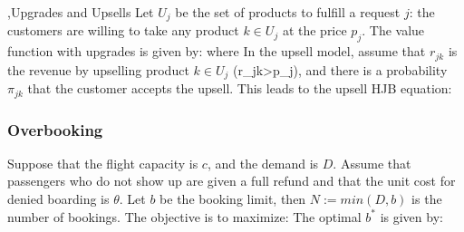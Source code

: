 \documentclass[12pt]{report}
\begin{document}
\sep{Upgrades and Upsells}
Let $U_j$ be the set of products to fulfill a request $j$: the customers are willing to take any product $k\in U_j$ at the price $p_j$. The value function with upgrades is given by:
where
In the upsell model, assume that $r_{jk}$ is the revenue by upselling product $k\in U_j$ (r_{jk}>p_j), and there is a probability $\pi_{jk}$ that the customer accepts the upsell.
This leads to the upsell HJB equation:

\subsubsection{Overbooking} \label{subsubsec:overbooking}
Suppose that the flight capacity is $c$, and the demand is $D$. Assume that passengers who do not show up are given a full refund
and that the unit cost for denied boarding is $\theta$. Let $b$ be the booking limit, then $N:= min(D, b)$ is the number of bookings.
The objective is to maximize:
\eq{
    R(b):=p\mathbb{E}[Z(\min(D,b))]-\theta\mathbb{E}[Z(\min(D,b))-c]^+].
}
The optimal $b^*$ is given by:
\end{document}
